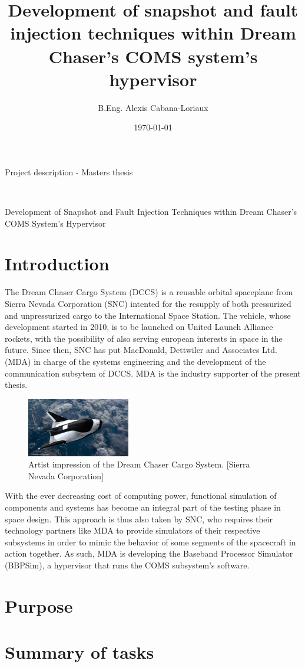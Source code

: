 \documentclass[12pt,english]{rftthesis}
\title           {Development of snapshot and fault injection techniques within Dream Chaser's COMS system's hypervisor}
\author          {B.Eng. Alexis Cabana-Loriaux}
\date            {\today}
\begin{document}
%
%
\begin{center}
\begin{large}
Project description - Masters thesis
\end{large}
\\
\vspace{.5cm}
\begin{LARGE}
Development of Snapshot and Fault Injection Techniques within Dream Chaser's COMS System's Hypervisor
\end{LARGE}
\end{center}

%
%
\section*{Introduction}\label{sec:intro}
The Dream Chaser Cargo System (DCCS) is a reusable orbital spaceplane from Sierra Nevada Corporation (SNC) intented for the resupply of both pressurized and unpressurized cargo to the International Space Station. The vehicle, whose development started in 2010, is to be launched on United Launch Alliance rockets, with the possibility of also serving european interests in space in the future. Since then, SNC has put MacDonald, Dettwiler and Associates Ltd. (MDA) in charge of the systems engineering and the development of the communication subsytem of DCCS. MDA is the industry supporter of the present thesis.

\begin{figure}
\centering
\includegraphics[width=0.4\textwidth]{art/dccs}
\caption{\label{fig:dccs}Artist impression of the Dream Chaser Cargo System. [Sierra Nevada Corporation]}
\end{figure}

With the ever decreasing cost of computing power, functional simulation of components and systems has become an integral part of the testing phase in space design. This approach is thus also taken by SNC, who requires their technology partners like MDA to provide simulators of their respective subsystems in order to mimic the behavior of some segments of the spacecraft in action together. As such, MDA is developing the Baseband Processor Simulator (BBPSim), a hypervisor that runs the COMS subsystem's software.

%
%
\section*{Purpose}\label{sec:purpose}

%
%
\section*{Summary of tasks}\label{sec:tasks}
\end{document}
